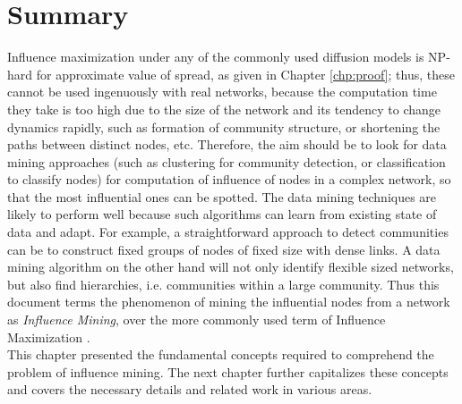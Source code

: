 	\section{Summary}
	Influence maximization under any of the commonly used diffusion models is NP-hard for approximate value of spread, as given in Chapter \ref{chp:proof}; thus, these cannot be used ingenuously with real networks, because the computation time they take is too high due to the size of the network and its tendency to change dynamics rapidly, such as formation of community structure, or shortening the paths between distinct nodes, etc. Therefore, the aim should be to look for data mining approaches (such as clustering for community detection, or classification to classify nodes) for computation of influence of nodes in a complex network, so that the most influential ones can be spotted. The data mining techniques are likely to perform well because such algorithms can learn from existing state of data and adapt. For example, a straightforward approach to detect communities can be to construct fixed groups of nodes of fixed size with dense links. A data mining algorithm on the other hand will not only identify flexible sized networks, but also find hierarchies, i.e. communities within a large community. Thus this document terms the phenomenon of mining the influential nodes from a network as \textit{Influence Mining}, over the more commonly used term of Influence Maximization \cite{vahidipour1920}. \\
	
This chapter presented the fundamental concepts required to comprehend the problem of influence mining. The next chapter further capitalizes these concepts and covers the necessary details and related work in various areas.
